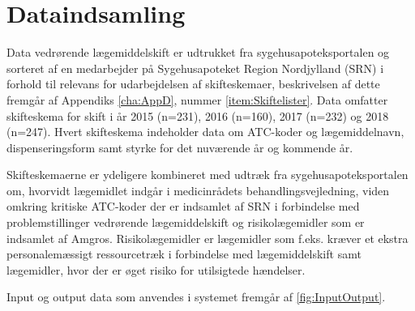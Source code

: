 
\section{Dataindsamling}
Data vedrørende lægemiddelskift er udtrukket fra sygehusapoteksportalen og sorteret af en medarbejder på Sygehusapoteket Region Nordjylland (SRN) i forhold til relevans for udarbejdelsen af skifteskemaer, beskrivelsen af dette fremgår af Appendiks \ref{cha:AppD}, nummer \ref{item:Skiftelister}. Data omfatter skifteskema for skift i år 2015 (n=231), 2016 (n=160), 2017 (n=232) og 2018 (n=247). Hvert skifteskema indeholder data om ATC-koder og lægemiddelnavn, dispenseringsform samt styrke for det nuværende år og kommende år.

Skifteskemaerne er ydeligere kombineret med udtræk fra sygehusapoteksportalen om, hvorvidt lægemidlet indgår i medicinrådets behandlingsvejledning, viden omkring kritiske ATC-koder der er indsamlet af SRN i forbindelse med problemstillinger vedrørende lægemiddelskift og risikolægemidler som er indsamlet af Amgros. Risikolægemidler er lægemidler som f.eks. kræver et ekstra personalemæssigt ressourcetræk i forbindelse med lægemiddelskift samt lægemidler, hvor der er øget risiko for utilsigtede hændelser.

Input og output data som anvendes i systemet fremgår af \ref{fig:InputOutput}.

